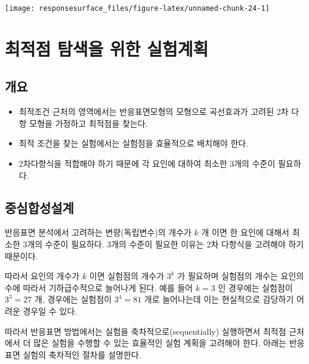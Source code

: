\documentclass[
]{book}
\theoremstyle{definition}
\theoremstyle{definition}
\theoremstyle{definition}
\theoremstyle{definition}
\theoremstyle{remark}
\begin{document}
\begin{center}\texttt{[image: responsesurface\_files/figure-latex/unnamed-chunk-24-1]} \end{center}

\hypertarget{expriment}{%
\chapter{최적점 탐색을 위한 실험계획}\label{expriment}}

\hypertarget{uxac1cuxc694-3}{%
\section{개요}\label{uxac1cuxc694-3}}

\begin{itemize}
\item
  최적조건 근처의 영역에서는 반응표면모형의 모형으로 곡선효과가 고려된 2차 다항 모형을 가정하고 최적점을 찾는다.
\item
  최적 조건을 찾는 실험에서는 실험점을 효율적으로 배치해야 한다.
\item
  2차다항식을 적합해야 하기 때문에 각 요인에 대하여 최소한 3개의 수준이 필요하다.
\end{itemize}

\hypertarget{uxc911uxc2ecuxd569uxc131uxc124uxacc4}{%
\section{중심합성설계}\label{uxc911uxc2ecuxd569uxc131uxc124uxacc4}}

반응표면 분석에서 고려하는 변량(독립변수)의 개수가 \(k\) 개 이면 한 요인에 대해서 최소한 3개의 수준이 필요하다. 3개의 수준이 필요한 이유는 2차 다항식을 고려해야 하기 때문이다.

따라서 요인의 개수가 \(k\) 이면 실험점의 개수가 \(3^k\) 가 필요하며 실험점의 개수는 요인의 수에 따라서 기하급수적으로 늘어나게 된다. 예를 들어 \(k=3\) 인 경우에는 실험점이 \(3^3=27\) 개, 경우에는 실험점이 \(3^4=81\) 개로 늘어나는데 이는 현실적으로 감당하기 어려운 경우일 수 있다.

따라서 반응표면 방법에서는 실험을 축차적으로(sequentially) 실행하면서 최적점 근처에서 더 많은 실험을 수행할 수 있는 효율적인 실험 계획을 고려해야 한다. 아래는 반응표면 실험의 축차적인 절차를 설명한다.
\end{document}

